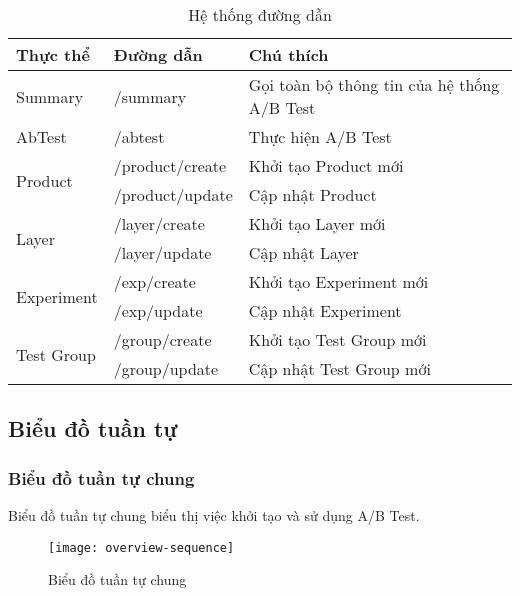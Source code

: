 \begin{table}[h!]
	\centering
	\begin{tabular}{|l|l|l|}
		\hline
		\textbf{Thực thể}           & \textbf{Đường dẫn} & \textbf{Chú thích}                          \\ \hline
		Summary                     & /summary           & Gọi toàn bộ thông tin của hệ thống A/B Test \\ \hline
		AbTest                      & /abtest            & Thực hiện A/B Test                          \\ \hline
		\multirow{2}{*}{Product}    & /product/create    & Khởi tạo Product mới                        \\ \cline{2-3}
		                            & /product/update    & Cập nhật Product                            \\ \hline
		\multirow{2}{*}{Layer}      & /layer/create      & Khởi tạo Layer mới                          \\ \cline{2-3}
		                            & /layer/update      & Cập nhật Layer                              \\ \hline
		\multirow{2}{*}{Experiment} & /exp/create        & Khởi tạo Experiment mới                     \\ \cline{2-3}
		                            & /exp/update        & Cập nhật Experiment                         \\ \hline
		\multirow{2}{*}{Test Group} & /group/create      & Khởi tạo Test Group mới                     \\ \cline{2-3}
		                            & /group/update      & Cập nhật Test Group mới                     \\ \hline
	\end{tabular}
	\caption{Hệ thống đường dẫn}
\end{table}

\subsection{Biểu đồ tuần tự}

\subsubsection{Biểu đồ tuần tự chung}

Biểu đồ tuần tự chung biểu thị việc khởi tạo và sử dụng A/B Test.

\begin{figure}[H]
	\centering
	\texttt{[image: overview-sequence]}
	\caption{Biểu đồ tuần tự chung}
\end{figure}

